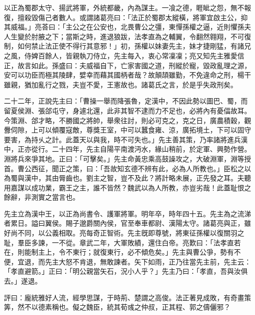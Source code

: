 \begin{pinyinscope}
以正為蜀郡太守、揚武將軍，外統都畿，內為謀主。一飡之德，睚眦之怨，無不報復，擅殺毀傷己者數人。或謂諸葛亮曰：「法正於蜀郡太縱橫，將軍宜啟主公，抑其威福。」亮荅曰：「主公之在公安也，北畏曹公之彊，東憚孫權之逼，近則懼孫夫人生變於肘腋之下；當斯之時，進退狼跋，法孝直為之輔翼，令翻然翱翔，不可復制，如何禁止法正使不得行其意邪！」初，孫權以妹妻先主，妹才捷剛猛，有諸兄之風，侍婢百餘人，皆親執刀侍立，先主每入，衷心常凜凜；亮又知先主雅愛信正，故言如此。孫盛曰：夫威福自下，亡家害國之道，刑縱於寵，毀政亂理之源，安可以功臣而極其陵肆，嬖幸而藉其國柄者哉？故顛頡雖勤，不免違命之刑，楊干雖親，猶加亂行之戮，夫豈不愛，王憲故也。諸葛氏之言，於是乎失政刑矣。

二十二年，正說先主曰：「曹操一舉而降張魯，定漢中，不因此勢以圖巴、蜀，而留夏侯淵、張郃屯守，身遽北還，此非其智不逮而力不足也，必將內有憂偪故耳。今策淵、郃才略，不勝國之將帥，舉衆往討，則必可克之，克之日，廣農積穀，觀釁伺隙，上可以傾覆寇敵，尊獎王室，中可以蠶食雍、涼，廣拓境土，下可以固守要害，為持乆之計。此蓋天以與我，時不可失也。」先主善其策，乃率諸將進兵漢中，正亦從行。二十四年，先主自陽平南渡沔水，緣山稍前，於定軍、興勢作營。淵將兵來爭其地。正曰：「可擊矣。」先主命黃忠乘高鼓譟攻之，大破淵軍，淵等授首。曹公西征，聞正之策，曰：「吾故知玄德不辨有此，必為人所教也。」臣松之以為蜀與漢中，其由脣齒也。劉主之智，豈不及此？將計略未展，正先發之耳。夫聽用嘉謀以成功業，霸王之主，誰不皆然？魏武以為人所教，亦豈劣哉！此蓋耻恨之餘辭，非測實之當言也。

先主立為漢中王，以正為尚書令、護軍將軍。明年卒，時年四十五。先主為之流涕者累日。謚曰翼侯。賜子邈爵關內侯，官至奉車都尉、漢陽太守。諸葛亮與正，雖好尚不同，以公義相取。亮每奇正智術。先主旣即尊號，將東征孫權以復關羽之耻，羣臣多諫，一不從。章武二年，大軍敗績，還住白帝。亮歎曰：「法孝直若在，則能制主上，令不東行；就復東行，必不傾危矣。」先主與曹公爭，勢有不便，宜退，而先主大怒不肯退，無敢諫者。矢下如雨，正乃往當先主前，先主云：「孝直避箭。」正曰：「明公親當矢石，況小人乎？」先主乃曰：「孝直，吾與汝俱去。」遂退。

評曰：龐統雅好人流，經學思謀，于時荊、楚謂之高俊。法正著見成敗，有奇畫策筭，然不以德素稱也。儗之魏臣，統其荀彧之仲叔，正其程、郭之儔儷邪？


\end{pinyinscope}